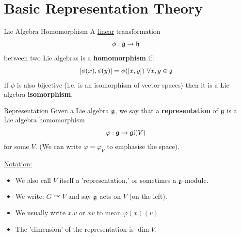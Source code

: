 \documentclass{article}
\begin{document}
\section{Basic Representation Theory}
\begin{fancydefine}{Lie Algebra Homomorphism}
    A \underline{linear} transformation \[ \phi : \mathfrak{g} \to \mathfrak{h} \] between two Lie algebras is a \textbf{homomorphism} if: \[
    [\phi(x), \phi(y)] = \phi([x,y]) \, \, \forall x,y \in \mathfrak{g} \]
    If $\phi$ is also bijective (i.e. is an isomorphism of vector spaces) then it is a Lie algebra \textbf{isomorphism}.
\end{fancydefine}
\begin{fancydefine}{Representation}
     Given a Lie algebra $\mathfrak{g}$, we say that a \textbf{representation} of $\mathfrak{g}$ is a Lie algebra homomorphism \[ \varphi : \mathfrak{g} \to \mathfrak{gl}(V) \] for some $V$. (We can write $\varphi = \varphi_{V}$ to emphasise the space).
\end{fancydefine}
\underline{Notation:}
\begin{itemize}
    \item We also call $V$ itself a 'representation,' or sometimes a $\mathfrak{g}$-module.
    \item We write: $G \curvearrowright V$ and say $\mathfrak{g}$ acts on $V$ (on the left).
    \item We usually write $x.v$ or $xv$ to mean $\varphi(x)(v)$
    \item The 'dimension' of the representation is $\dim V$.
\end{itemize}
\exs \hspace{0.1cm}
\end{document}
